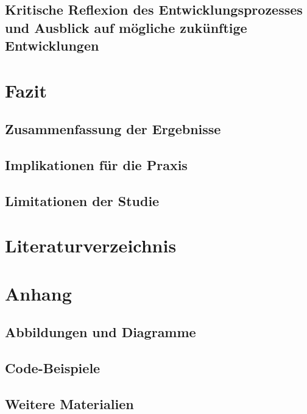 \documentclass[12pt,a4paper,bibliography=totocnumbered,listof=totocnumbered]{scrartcl}
\begin{document}
\subsection{Kritische Reflexion des Entwicklungsprozesses und Ausblick auf mögliche zukünftige Entwicklungen}

\section{Fazit}
\subsection{Zusammenfassung der Ergebnisse}
\subsection{Implikationen für die Praxis}
\subsection{Limitationen der Studie}

\section{Literaturverzeichnis}

\section{Anhang}
\subsection{Abbildungen und Diagramme}
\subsection{Code-Beispiele}
\subsection{Weitere Materialien}
\end{document}
